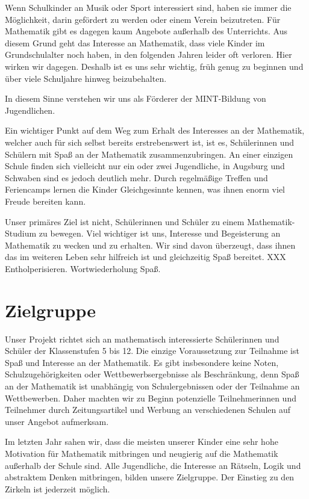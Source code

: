 \documentclass[12pt]{zettel}
\begin{document}
Wenn Schulkinder an Musik oder Sport interessiert sind, haben sie immer die
Möglichkeit, darin gefördert zu werden oder einem Verein beizutreten. Für
Mathematik gibt es dagegen kaum Angebote außerhalb des Unterrichts. Aus diesem
Grund geht das Interesse an Mathematik, dass viele Kinder im Grundschulalter
noch haben, in den folgenden Jahren leider oft verloren. Hier wirken wir
dagegen. Deshalb ist es uns sehr wichtig, früh genug zu beginnen und über viele
Schuljahre hinweg beizubehalten.

In diesem Sinne verstehen wir uns als Förderer der MINT-Bildung von
Jugendlichen.

Ein wichtiger Punkt auf dem Weg zum Erhalt des Interesses an der
Mathematik, welcher auch für sich selbst bereits erstrebenswert ist, ist es,
Schülerinnen und Schülern mit Spaß an der Mathematik zusammenzubringen.
An einer einzigen Schule finden sich vielleicht
nur ein oder zwei Jugendliche, in Augsburg und Schwaben sind es jedoch
deutlich mehr. Durch regelmäßige Treffen und Feriencamps lernen die
Kinder Gleichgesinnte kennen, was ihnen enorm viel Freude bereiten kann.

Unser primäres Ziel ist nicht, Schülerinnen und Schüler zu einem
Mathematik-Studium zu bewegen. Viel wichtiger ist uns, Interesse und
Begeisterung an Mathematik zu wecken und zu erhalten. Wir sind davon
überzeugt, dass ihnen das im weiteren Leben sehr hilfreich ist und gleichzeitig
Spaß bereitet. XXX Entholperisieren. Wortwiederholung Spaß.


\section{Zielgruppe}

Unser Projekt richtet sich an mathematisch interessierte Schülerinnen
und Schüler der Klassenstufen 5 bis 12. Die einzige Voraussetzung zur
Teilnahme ist Spaß und Interesse an der Mathematik. Es gibt insbesondere
keine Noten, Schulzugehörigkeiten oder Wettbewerbsergebnisse als
Beschränkung, denn Spaß an der Mathematik
ist unabhängig von Schulergebnissen oder der Teilnahme an
Wettbewerben. Daher machten wir zu Beginn potenzielle Teilnehmerinnen und
Teilnehmer durch Zeitungsartikel und Werbung an verschiedenen Schulen
auf unser Angebot aufmerksam.

Im letzten Jahr sahen wir, dass die meisten unserer Kinder eine
sehr hohe Motivation für Mathematik mitbringen und neugierig auf die
Mathematik außerhalb der Schule sind. Alle Jugendliche, die Interesse an
Rätseln, Logik und abstraktem Denken mitbringen, bilden unsere
Zielgruppe. Der Einstieg zu den Zirkeln ist jederzeit möglich.
\end{document}
